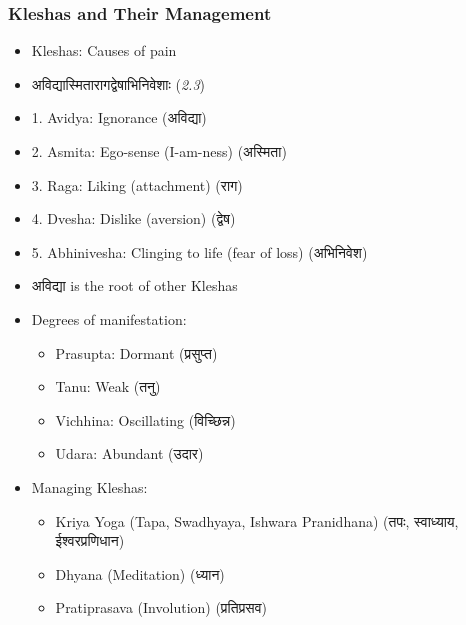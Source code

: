 \begin{frame}[fragile]\frametitle{Kleshas and Their Management}
    \begin{itemize}
        \item Kleshas: Causes of pain
        \item अविद्यास्मितारागद्वेषाभिनिवेशाः (\textit{2.3})
        \item 1. Avidya: Ignorance (अविद्या)
        \item 2. Asmita: Ego-sense (I-am-ness) (अस्मिता)
        \item 3. Raga: Liking (attachment) (राग)
        \item 4. Dvesha: Dislike (aversion) (द्वेष)
        \item 5. Abhinivesha: Clinging to life (fear of loss) (अभिनिवेश)
        \item अविद्या is the root of other Kleshas
        \item Degrees of manifestation:
        \begin{itemize}
            \item Prasupta: Dormant (प्रसुप्त)
            \item Tanu: Weak (तनु)
            \item Vichhina: Oscillating (विच्छिन्न)
            \item Udara: Abundant (उदार)
        \end{itemize}
        \item Managing Kleshas:
        \begin{itemize}
            \item Kriya Yoga (Tapa, Swadhyaya, Ishwara Pranidhana) (तपः, स्वाध्याय, ईश्वरप्रणिधान)
            \item Dhyana (Meditation) (ध्यान)
            \item Pratiprasava (Involution) (प्रतिप्रसव)
        \end{itemize}
    \end{itemize}
\end{frame}

